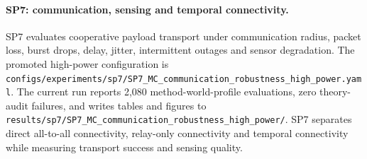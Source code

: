 \paragraph{SP7: communication, sensing and temporal connectivity.}
SP7 evaluates cooperative payload transport under communication radius, packet loss, burst drops, delay, jitter, intermittent outages and sensor degradation. The promoted high-power configuration is \texttt{configs/experiments/sp7/SP7\_MC\_communication\_robustness\_high\_power.yaml}. The current run reports 2,080 method-world-profile evaluations, zero theory-audit failures, and writes tables and figures to \texttt{results/sp7/SP7\_MC\_communication\_robustness\_high\_power/}. SP7 separates direct all-to-all connectivity, relay-only connectivity and temporal connectivity while measuring transport success and sensing quality.
